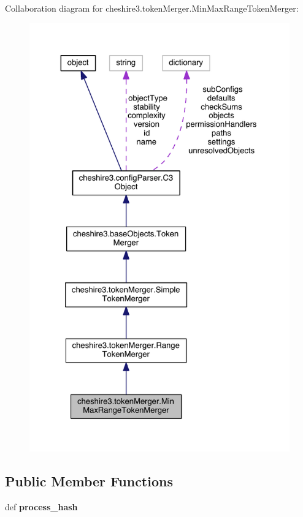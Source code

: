 Collaboration diagram for cheshire3.\-token\-Merger.\-Min\-Max\-Range\-Token\-Merger\-:
\nopagebreak
\begin{figure}[H]
\begin{center}
\leavevmode
\includegraphics[width=325pt]{classcheshire3_1_1token_merger_1_1_min_max_range_token_merger__coll__graph}
\end{center}
\end{figure}
\subsection*{Public Member Functions}
\begin{DoxyCompactItemize}
\item 
\hypertarget{classcheshire3_1_1token_merger_1_1_min_max_range_token_merger_ac82c55edf4f3572337fd5f583fd4b13a}{def {\bfseries process\-\_\-hash}}\label{classcheshire3_1_1token_merger_1_1_min_max_range_token_merger_ac82c55edf4f3572337fd5f583fd4b13a}

\end{DoxyCompactItemize}
